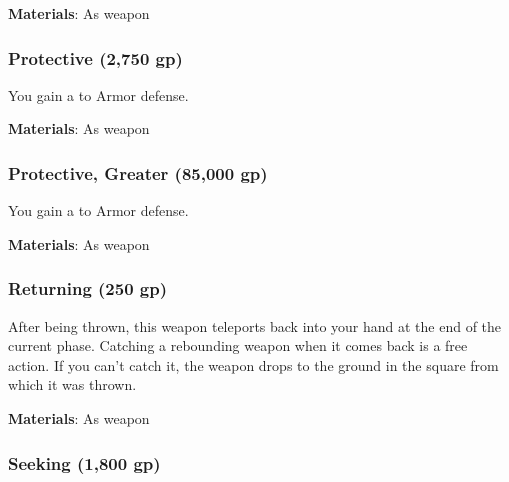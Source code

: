 \vspace{0.25em}
\textbf{Materials}: As weapon


\lowercase{\hypertarget{item:Protective}{}}\label{item:Protective}
\hypertarget{item:Protective}{\subsubsection{Protective\hfill{} (2,750 gp)}}

You gain a   to Armor defense.



\vspace{0.25em}
\textbf{Materials}: As weapon


\lowercase{\hypertarget{item:Protective, Greater}{}}\label{item:Protective, Greater}
\hypertarget{item:Protective, Greater}{\subsubsection{Protective, Greater\hfill{} (85,000 gp)}}

You gain a   to Armor defense.



\vspace{0.25em}
\textbf{Materials}: As weapon


\lowercase{\hypertarget{item:Returning}{}}\label{item:Returning}
\hypertarget{item:Returning}{\subsubsection{Returning\hfill{} (250 gp)}}

After being thrown, this weapon teleports back into your hand at the end of the current phase.
Catching a rebounding weapon when it comes back is a free action.
If you can't catch it, the weapon drops to the ground in the square from which it was thrown.



\vspace{0.25em}
\textbf{Materials}: As weapon


\lowercase{\hypertarget{item:Seeking}{}}\label{item:Seeking}
\hypertarget{item:Seeking}{\subsubsection{Seeking\hfill{} (1,800 gp)}}

